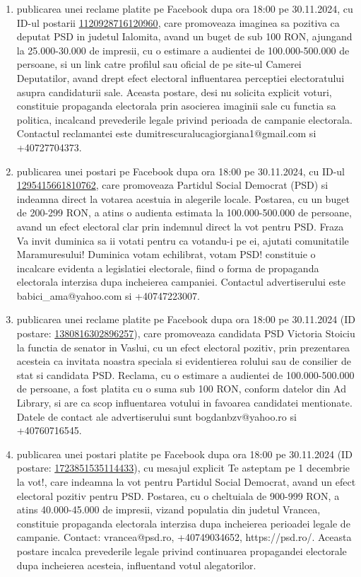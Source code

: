 \documentclass[a4paper,12pt]{article}
\begin{document}
\begin{enumerate}[leftmargin=*, label=\arabic*.)]
    \item publicarea unei reclame platite pe Facebook dupa ora 18:00 pe 30.11.2024, cu ID-ul postarii \href{https://www.facebook.com/ads/library/?id=1120928716120960}{1120928716120960}, care promoveaza imaginea sa pozitiva ca deputat PSD in judetul Ialomita, avand un buget de sub 100 RON,  ajungand la 25.000-30.000 de impresii, cu o estimare a audientei de 100.000-500.000 de persoane,  si un link catre profilul sau oficial de pe site-ul Camerei Deputatilor,  avand drept efect electoral influentarea perceptiei electoratului asupra candidaturii sale.  Aceasta postare, desi nu solicita explicit voturi, constituie propaganda electorala prin asocierea imaginii sale cu functia sa politica, incalcand prevederile legale privind perioada de campanie electorala.  Contactul reclamantei este dumitrescuralucagiorgiana1@gmail.com si +40727704373.
    \item publicarea unei postari pe Facebook dupa ora 18:00 pe 30.11.2024, cu ID-ul \href{https://www.facebook.com/ads/library/?id=1295415661810762}{1295415661810762}, care promoveaza Partidul Social Democrat (PSD) si indeamna direct la votarea acestuia in alegerile locale. Postarea, cu un buget de 200-299 RON, a atins o audienta estimata la 100.000-500.000 de persoane, avand un efect electoral clar prin indemnul direct la vot pentru PSD.  Fraza Va invit duminica sa ii votati pentru ca votandu-i pe ei, ajutati comunitatile Maramuresului! Duminica votam echilibrat, votam PSD! constituie o incalcare evidenta a legislatiei electorale, fiind o forma de propaganda electorala interzisa dupa incheierea campaniei.  Contactul advertiserului este babici\_ama@yahoo.com si +40747223007.
    \item publicarea unei reclame platite pe Facebook dupa ora 18:00 pe 30.11.2024 (ID postare: \href{https://www.facebook.com/ads/library/?id=1380816302896257}{1380816302896257}), care promoveaza candidata PSD Victoria Stoiciu la functia de senator in Vaslui, cu un efect electoral pozitiv, prin prezentarea acesteia ca invitata noastra speciala si evidentierea rolului sau de consilier de stat si candidata PSD.  Reclama, cu o estimare a audientei de 100.000-500.000 de persoane,  a fost platita cu o suma sub 100 RON, conform datelor din Ad Library, si are ca scop influentarea votului in favoarea candidatei mentionate.  Datele de contact ale advertiserului sunt bogdanbzv@yahoo.ro si +40760716545.
    \item publicarea unei postari platite pe Facebook dupa ora 18:00 pe 30.11.2024 (ID postare: \href{https://www.facebook.com/ads/library/?id=1723851535114433}{1723851535114433}), cu mesajul explicit Te asteptam pe 1 decembrie la vot!,  care indeamna la vot pentru Partidul Social Democrat, avand un efect electoral pozitiv pentru PSD. Postarea, cu o cheltuiala de 900-999 RON, a atins 40.000-45.000 de impresii, vizand populatia din judetul Vrancea, constituie propaganda electorala interzisa dupa incheierea perioadei legale de campanie.  Contact: vrancea@psd.ro, +40749034652, https://psd.ro/.  Aceasta postare incalca prevederile legale privind continuarea propagandei electorale dupa incheierea acesteia, influentand votul alegatorilor.

\end{enumerate}
\end{document}
